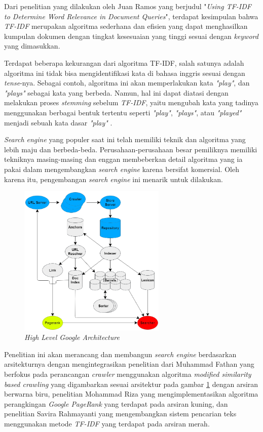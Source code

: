 Dari penelitian yang dilakukan oleh Juan Ramos yang berjudul "\textit{Using TF-IDF to Determine Word Relevance in Document Queries}", terdapat kesimpulan bahwa \textit{TF-IDF} merupakan algoritma sederhana dan efisien yang dapat menghasilkan kumpulan dokumen dengan tingkat kesesuaian yang tinggi sesuai dengan \textit{keyword} yang dimasukkan.

Terdapat beberapa kekurangan dari algoritma TF-IDF, salah satunya adalah algoritma ini tidak bisa mengidentifikasi kata di bahasa inggris sesuai dengan \textit{tense}-nya. Sebagai contoh, algoritma ini akan memperlakukan kata \textit{"play"}, dan \textit{"plays"} sebagai kata yang berbeda. Namun, hal ini dapat diatasi dengan melakukan proses \textit{stemming} sebelum \textit{TF-IDF}, yaitu mengubah kata yang tadinya menggunakan berbagai bentuk tertentu seperti \textit{"play"}, \textit{"plays"}, atau \textit{"played"} menjadi sebuah kata dasar \textit{"play"} \citep{qaiser2018text}.

\textit{Search engine} yang populer saat ini telah memiliki teknik dan algoritma yang lebih maju dan berbeda-beda. Perusahaan-perusahaan besar pemiliknya memiliki tekniknya masing-masing dan enggan membeberkan detail algoritma yang ia pakai dalam mengembangkan \textit{search engine} karena bersifat komersial. Oleh karena itu, pengembangan \textit{search engine} ini menarik untuk dilakukan.

\begin{figure}[H]
	\centering
	\includegraphics[keepaspectratio, width=7cm]{gambar/google_architecture_filled}
	\caption{\emph{High Level Google Architecture} \citep{brin1998anatomy}}
	\label{gambar:google_architecture_filled}
\end{figure}

Penelitian ini akan merancang dan membangun \textit{search engine} berdasarkan arsitekturnya dengan mengintegrasikan penelitian dari Muhammad Fathan yang berfokus pada perancangan \textit{crawler} menggunakan algoritma \textit{modified similarity based crawling} yang digambarkan sesuai arsitektur pada gambar \ref{gambar:google_architecture_filled} dengan arsiran berwarna biru, penelitian Mohammad Riza yang mengimplementasikan algoritma perangkingan \textit{Google PageRank} yang terdapat pada arsiran kuning, dan penelitian Savira Rahmayanti yang mengembangkan sistem pencarian teks menggunakan metode \textit{TF-IDF} yang terdapat pada arsiran merah.

